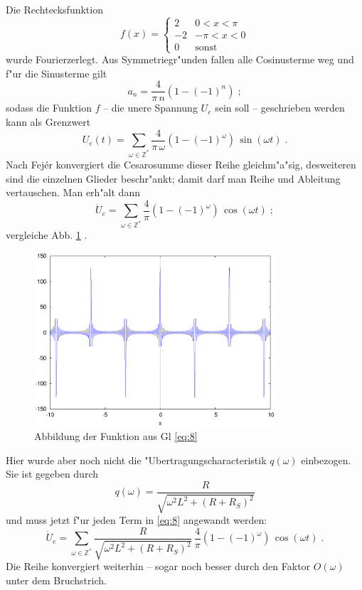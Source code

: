 \message{ !name(uebertr01.tex)}\documentclass[a4paper,12pt,draft]{article}
\begin{document}
Die Rechtecksfunktion 
\begin{equation*}
  f(x) =
  \begin{cases}
    2 & 0 < x < \pi \\
    -2 & -\pi < x < 0 \\
    0 & \text{sonst}
  \end{cases}
\end{equation*}
wurde Fourierzerlegt. Aus Symmetriegr"unden fallen alle Cosinusterme
weg und f"ur die Sinusterme gilt
\begin{equation*}
  a_n = \frac{4}{\pi \, n} ( 1 - (-1)^n ) \;;
\end{equation*}
sodass die Funktion $f$ -- die unere Spannung $U_e$ sein soll -- geschrieben werden kann als Grenzwert 
\begin{equation}
  \label{eq:7}
  U_e(t) = \sum_{\omega \in \mathbb Z^\ast} \frac{4}{\pi \, \omega} ( 1 -
  (-1)^\omega ) \, \sin( \omega t) \;.
\end{equation}
Nach Fej\'er konvergiert die Cesarosumme dieser Reihe gleichm"a"sig,
desweiteren sind die einzelnen Glieder beschr"ankt; damit darf man
Reihe und Ableitung vertauschen. Man erh"alt dann
\begin{equation}
  \label{eq:8}
  \dot U_e = \sum_{\omega \in \mathbb Z^\ast} \frac{4}{\pi} ( 1 -
  (-1)^\omega ) \, \cos( \omega t) \;;
\end{equation}
vergleiche Abb. \ref{fig:delta} \;.


\begin{figure}
  \centering
  \includegraphics[width=0.8\textwidth]{delta}
  \caption{Abbildung der Funktion aus Gl \eqref{eq:8}}
  \label{fig:delta}
\end{figure}


Hier wurde aber noch nicht die "Ubertragungscharacteristik $q(\omega)$
einbezogen. Sie ist gegeben durch
\begin{equation}
  \label{eq:9}
  q(\omega) = \frac{R}{\sqrt{ \omega^2 L^2 + (R + R_S)^2} }
\end{equation}
und muss jetzt f"ur jeden Term in \eqref{eq:8} angewandt werden:
\begin{equation}
  \label{eq:10}
  \dot U_e = \sum_{\omega \in \mathbb Z^\ast} \frac{R}{\sqrt{ \omega^2
      L^2 + (R + R_S)^2} } \, \frac{4}{\pi} ( 1 -
  (-1)^\omega ) \, \cos( \omega t) \;.
\end{equation}
Die Reihe konvergiert weiterhin -- sogar noch besser durch den Faktor
$O(\omega)$ unter dem Bruchstrich.
 
 
 
 
 
 
 
 



\end{document}
